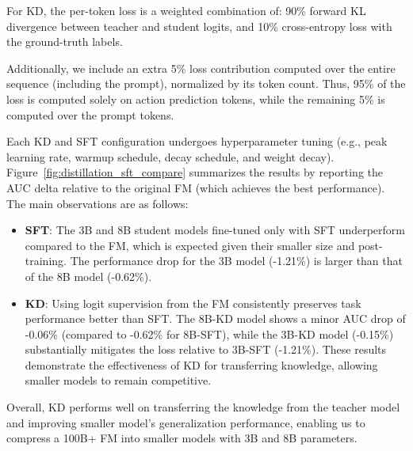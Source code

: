 For KD, the per-token loss is a weighted combination of: 90\% forward KL divergence between teacher and student logits, and 10\% cross-entropy loss with the ground-truth labels.

Additionally, we include an extra 5\% loss contribution computed over the entire sequence (including the prompt), normalized by its token count. Thus, 95\% of the loss is computed solely on action prediction tokens, while the remaining 5\% is computed over the prompt tokens.

Each KD and SFT configuration undergoes hyperparameter tuning (e.g., peak learning rate, warmup schedule, decay schedule, and weight decay). Figure~\ref{fig:distillation_sft_compare} summarizes the results by reporting the AUC delta relative to the original FM (which achieves the best performance). The main observations are as follows:
\begin{itemize}
    \item \textbf{SFT}: The 3B and 8B student models fine-tuned only with SFT underperform compared to the FM, which is expected given their smaller size and post-training. The performance drop for the 3B model (-1.21\%) is larger than that of the 8B model (-0.62\%).
    \item \textbf{KD}: Using logit supervision from the FM consistently preserves task performance better than SFT. The 8B-KD model shows a minor AUC drop of -0.06\% (compared to -0.62\% for 8B-SFT), while the 3B-KD model (-0.15\%) substantially mitigates the loss relative to 3B-SFT (-1.21\%). These results demonstrate the effectiveness of KD for transferring knowledge, allowing smaller models to remain competitive.
\end{itemize}

Overall, KD performs well on transferring the knowledge from the teacher model and improving smaller model's generalization performance, enabling us to compress a 100B+ FM into smaller models with 3B and 8B parameters. 









